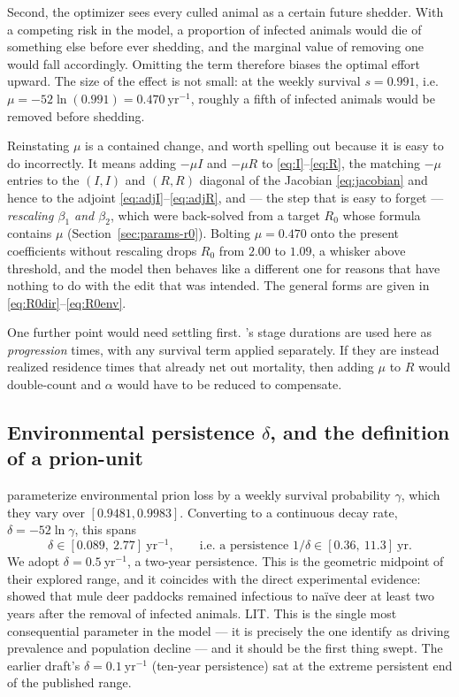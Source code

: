 \documentclass[11pt]{article}
\newcommand{\tagLIT}{{\footnotesize\textsf{\textcolor{green!40!black}{LIT}}}}
\begin{document}
Second, the optimizer sees every culled animal as a certain future shedder. With a competing risk in the model, a proportion of infected animals would die of something else before ever shedding, and the marginal value of removing one would fall accordingly. Omitting the term therefore biases the optimal effort upward. The size of the effect is not small: at the \citet{Almberg2011} weekly survival $s = 0.991$, i.e.\ $\mu = -52\ln(0.991) = 0.470\ \mathrm{yr}^{-1}$, roughly a fifth of infected animals would be removed before shedding.

Reinstating $\mu$ is a contained change, and worth spelling out because it is easy to do incorrectly. It means adding $-\mu I$ and $-\mu R$ to \eqref{eq:I}--\eqref{eq:R}, the matching $-\mu$ entries to the $(I,I)$ and $(R,R)$ diagonal of the Jacobian \eqref{eq:jacobian} and hence to the adjoint \eqref{eq:adjI}--\eqref{eq:adjR}, and --- the step that is easy to forget --- \emph{rescaling $\beta_1$ and $\beta_2$}, which were back-solved from a target $R_0$ whose formula contains $\mu$ (Section~\ref{sec:params-r0}). Bolting $\mu = 0.470$ onto the present coefficients without rescaling drops $R_0$ from $2.00$ to $1.09$, a whisker above threshold, and the model then behaves like a different one for reasons that have nothing to do with the edit that was intended. The general forms are given in \eqref{eq:R0dir}--\eqref{eq:R0env}.

One further point would need settling first. \citeauthor{Almberg2011}'s stage durations are used here as \emph{progression} times, with any survival term applied separately. If they are instead realized residence times that already net out mortality, then adding $\mu$ to $R$ would double-count and $\alpha$ would have to be reduced to compensate.

\subsection{Environmental persistence $\delta$, and the definition of a prion-unit}

\citet{Almberg2011} parameterize environmental prion loss by a weekly survival probability $\gamma$, which they vary over $[0.9481, 0.9983]$. Converting to a continuous decay rate, $\delta = -52\ln\gamma$, this spans
\[
\delta \in [0.089,\ 2.77]\ \mathrm{yr}^{-1},
\qquad\text{i.e. a persistence } 1/\delta \in [0.36,\ 11.3]\ \text{yr}.
\]
We adopt $\delta = 0.5\ \mathrm{yr}^{-1}$, a two-year persistence. This is the geometric midpoint of their explored range, and it coincides with the direct experimental evidence: \citet{Miller2004} showed that mule deer paddocks remained infectious to na\"ive deer at least two years after the removal of infected animals. \tagLIT{}. This is the single most consequential parameter in the model --- it is precisely the one \citet{Almberg2011} identify as driving prevalence and population decline --- and it should be the first thing swept. The earlier draft's $\delta = 0.1\ \mathrm{yr}^{-1}$ (ten-year persistence) sat at the extreme persistent end of the published range.
\end{document}
